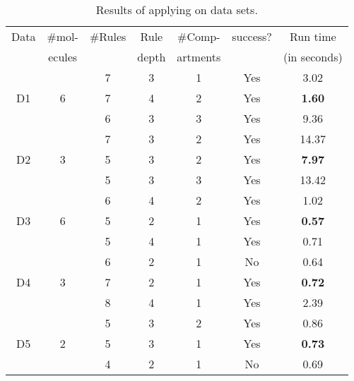 \begin{table}[t]
  \centering
  \scriptsize
  \begin{tabular}[t]{|c|c|c|c|c|c|c|}\hline
    Data & \#mol- & \#Rules & Rule  & \#Comp- & success? & Run time \\
         & ecules   &         & depth & artments &          & (in seconds) \\\hline
         &   & 7  & 3 & 1 & Yes &  3.02 \\\cline{3-7}
    D1   & 6 & 7  & 4 & 2 & Yes & {\bf 1.60}  \\\cline{3-7}
         &   & 6  & 3 & 3 & Yes & 9.36  \\\hline
         
         &   & 7  & 3 & 2 & Yes & 14.37  \\\cline{3-7}
    D2   & 3 & 5  & 3 & 2 & Yes & {\bf 7.97}  \\\cline{3-7}
         &   & 5  & 3 & 3 & Yes  &  13.42 \\\hline
         
         &   & 6  & 4  & 2  & Yes & 1.02  \\\cline{3-7}
    D3   & 6 & 5  & 2 & 1 & Yes & {\bf 0.57}  \\\cline{3-7}
         &   & 5  & 4 & 1 & Yes  &  0.71 \\\hline
         
         &   & 6  & 2 & 1 & No &  0.64 \\\cline{3-7}
    D4   & 3 & 7  & 2 & 1 & Yes & {\bf 0.72}  \\\cline{3-7}
         &   & 8  & 4 & 1 & Yes  &  2.39 \\\hline
         
         &   & 5  & 3 & 2 & Yes &  0.86 \\\cline{3-7}
    D5   & 2 & 5  & 3 & 1 & Yes & {\bf 0.73}  \\\cline{3-7}
         &   & 4  & 2 & 1 & No  & 0.69  \\\hline
    


  \end{tabular}
  \caption{Results of applying \ourtool on data sets.
  }
  \label{tab:results}
\end{table}
